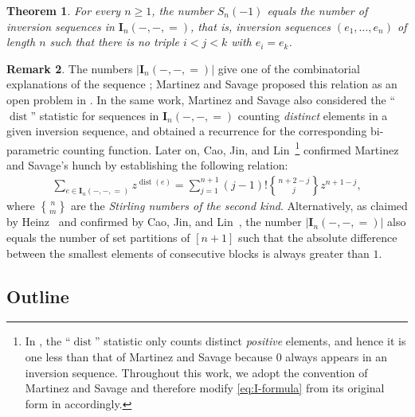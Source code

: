 \documentclass[12pt,reqno]{amsart}
\numberwithin{equation}{section}
\theoremstyle{theorem}
\newtheorem{theorem}{Theorem}[section]
\theoremstyle{definition}
\newtheorem{remark}[theorem]{Remark}
\theoremstyle{named}
\newcommand{\OEIS}[1]{\href{https://oeis.org/#1}{#1}}
\newcommand{\dist}{\operatorname{dist}}
\newcommand{\stirlingb}[2]{{#1\brace #2}}
\newcommand{\bI}{\mathbf{I}}
\begin{document}
\begin{theorem}\label{thm:q=-1}
	For every $n\ge 1$, the number $S_n(-1)$ equals the number of inversion sequences in $\bI_n(-,-,=)$, that is, inversion sequences $(e_1,\ldots,e_n)$ of length $n$ such that there is no triple $i < j < k$ with $e_i = e_k$.
\end{theorem}

\begin{remark}\label{rmk:q=-1}
	The numbers $|\bI_n(-,-,=)|$ give one of the combinatorial explanations of the sequence \cite[\OEIS{A229046}]{OEIS}; Martinez and Savage proposed this relation as an open problem in \cite[Section~2.13]{MS2018}. In the same work, Martinez and Savage also considered the ``$\dist$'' statistic for sequences in $\bI_n(-,-,=)$ counting \emph{distinct} elements in a given inversion sequence, and obtained a recurrence for the corresponding bi-parametric counting function. Later on, Cao, Jin, and Lin~\cite[p.~96, Proposition~7.2]{CJL2019}\footnote{In \cite{CJL2019}, the ``$\dist$'' statistic only counts distinct \emph{positive} elements, and hence it is one less than that of Martinez and Savage because $0$ always appears in an inversion sequence. Throughout this work, we adopt the convention of Martinez and Savage and therefore modify \eqref{eq:I-formula} from its original form in \cite{CJL2019} accordingly.} confirmed Martinez and Savage's hunch by establishing the following relation:
	\begin{align}\label{eq:I-formula}
		\sum_{e\in \bI_n(-,-,=)} z^{\dist(e)} = \sum_{j=1}^{n+1} (j-1)! \stirlingb{n+2-j}{j}z^{n+1-j},
	\end{align}
	where $\stirlingb{n}{m}$ are the \emph{Stirling numbers of the second kind}. Alternatively, as claimed by Heinz~\cite[A229046]{OEIS} and confirmed by Cao, Jin, and Lin~\cite[p.~96, Theorem~7.1]{CJL2019}, the number $|\bI_n(-,-,=)|$ also equals the number of set partitions of $[n+1]$ such that the absolute difference between the smallest elements of consecutive blocks is always greater than $1$.
\end{remark}

\subsection{Outline}\label{sec:outline}
\end{document}
